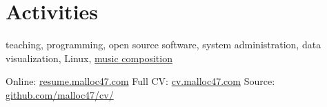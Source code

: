\documentclass[10pt]{article}
\begin{document}
\section{Activities}
teaching, programming, open source software, system administration,
data visualization, Linux,
\href{https://soundcloud.com/malloc47}{music composition}

\null\vfill
\footnotesize{
  Online:  \href{http://resume.malloc47.com}{resume.malloc47.com} \hfill
  Full CV: \href{http://cv.malloc47.com}{cv.malloc47.com} \hfill 
  Source:  \href{https://github.com/malloc47/cv}{github.com/malloc47/cv/}
}

\pagestyle{myheadings}

\end{document}
